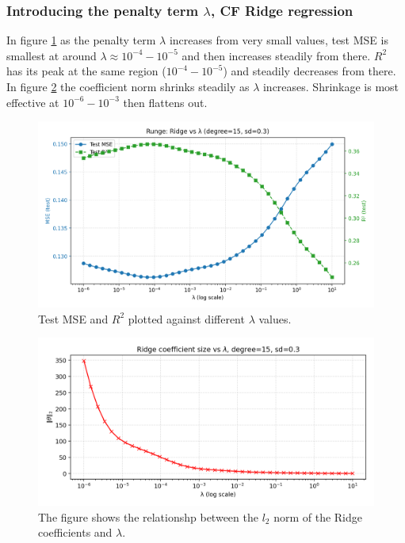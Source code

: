 \documentclass[amssymb,twocolumn,aps]{revtex4-2}
\begin{document}
\subsubsection{Introducing the penalty term $\lambda$, CF Ridge regression}

In figure \ref{fig:ridge_mse_lambda} as the penalty term $\lambda$ increases from very small values, test MSE is smallest at around $\lambda \approx 10^{-4}-10^{-5}$ and then increases steadily from there. $R^2$ has its peak at the same region ($10^{-4}-10^{-5}$) and steadily decreases from there. In figure \ref{fig:ridge_theta_norms} the coefficient norm shrinks steadily as $\lambda$ increases. Shrinkage is most effective at $10^{-6}-10^{-3}$ then flattens out. 

\begin{figure}[H]
    \centering
    \includegraphics[width=1\linewidth]{Project-1/Figures/runge_ridge_mse_r2_vs_lambda.png}
    \caption{Test MSE and $R^2$ plotted against different $\lambda$ values.}
    \label{fig:ridge_mse_lambda}
\end{figure}

\begin{figure}[H]
    \centering
    \includegraphics[width=1\linewidth]{Project-1/Figures/ridge_theta_norms_vs_lambda.png}
    \caption{The figure shows the relationshp between the $l_2$ norm of the Ridge coefficients and $\lambda$. }
    \label{fig:ridge_theta_norms}
\end{figure}
\end{document}

